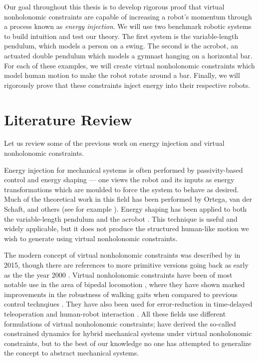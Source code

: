 Our goal throughout this thesis is to develop rigorous proof that virtual
nonholonomic constraints are capable of increasing a robot's momentum through a
process known as \textit{energy injection}.
We will use two benchmark robotic systems to build intuition and test
our theory.
The first system is the variable-length pendulum, which models a person
on a swing.
The second is the acrobot, an actuated double pendulum which models a gymnast
hanging on a horizontal bar.
For each of these examples, we will create virtual nonholonomic
constraints which model human motion to make the robot rotate around a bar.
Finally, we will rigorously prove that these constraints inject energy into
their respective robots.

\section{Literature Review}
Let us review some of the previous work on energy injection and virtual
nonholonomic constraints.

Energy injection for mechanical systems is often performed by passivity-based
control and energy shaping --- one views the robot and its inputs as energy
transformations which are moulded to force the system to behave as desired.
Much of the theoretical work in this field has been performed by Ortega, van der
Schaft, and others (see for example \cite{ida_pbc_underactuation_one,
ida_pbc_acrobot_example,energy_shaping_revisited}).
Energy shaping has been applied to both the variable-length
pendulum \cite{vlp_energy_shaping} and the acrobot
\cite{swingup_acrobot_energy,swingup_giant_acrobot}.
This technique is useful and widely applicable, but it does not
produce the structured human-like motion we wish to generate using virtual
nonholonomic constraints.

The modern concept of virtual nonholonomic constraints was described by
\citet{nhvc_dynamic_walking} in 2015, though there are references to more
primitive versions going back as early as the the year 2000
\cite{vnhc_human_robot_cooperation}.
Virtual nonholonomic constraints have been of most notable use in the area of
bipedal locomotion \cite{nhvc_incline_walking,output_nhvc_bipedal_conrol},
where they have shown marked improvements in the robustness of walking gaits
when compared to previous control technqiues \cite{nhvc_incline_walking}.
They have also been used for error-reduction in time-delayed teleoperation
\cite{vnhc_time_delay_teleop} and human-robot interaction
\cite{psd_based_vnhc_redundant_manipulator,haptic_vnhc}.
All these fields use different formulations of virtual nonholonomic constraints;
\citet{hybrid_zero_dynamics_bipedal_nhvcs} have derived the so-called
constrained dynamics for hybrid mechanical systems under virtual nonholonomic
constraints, but to the best of our knowledge no one has attempted to generalize
the concept to abstract mechanical systems.

